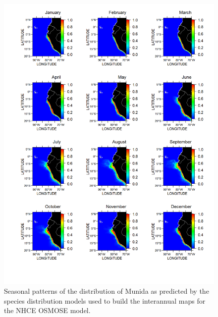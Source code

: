\begin{figure}
\centering
\includegraphics[height=0.8\textheight]{figures/munida-climatology}
\caption[Seasonal patterns of the distribution of Munida]{Seasonal patterns of the distribution of Munida as predicted by the species distribution models used to build the interannual maps for the NHCE OSMOSE model.}
\label{fig:munida-climatology}
\end{figure}

